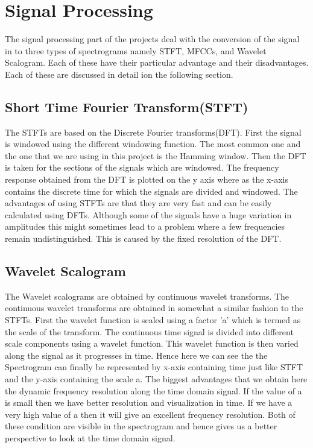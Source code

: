 \documentclass[conference]{IEEEtran}
\begin{document}
\section{Signal Processing}
The signal processing part of the projects deal with the conversion of the signal in to three types of spectrograms namely STFT, MFCCs, and Wavelet Scalogram. Each of these have their particular advantage and their disadvantages. Each of these are discussed in detail ion the following section.

\subsection{Short Time Fourier Transform(STFT)}

The STFTs are based on the Discrete Fourier transforms(DFT). First the signal is windowed using the different windowing function. The most common one and the one that we are using in this project is the Hamming window. Then the DFT is taken for the sections of the signals which are windowed. The frequency response obtained from the DFT is plotted on the y axis where as the x-axis contains the discrete time for which the signals are divided and windowed. The advantages of using STFTs are that they are very fast and can be easily calculated using DFTs. Although some of the signals have a huge variation in amplitudes this might sometimes lead to a problem where a few frequencies remain undistinguished. This is caused by the fixed resolution of the DFT.

\subsection{Wavelet Scalogram}

The Wavelet scalograms are obtained by continuous wavelet transforms. The continuous wavelet transforms are obtained in somewhat a similar fashion to the STFTs. First the wavelet function is scaled using a factor 'a' which is termed as the scale of the transform. The continuous time signal is divided into different scale components using a wavelet function. This wavelet function is then varied along the signal as it progresses in time. Hence here we can see the the Spectrogram can finally be represented by x-axis containing time just like STFT and the y-axis containing the scale a. The biggest advantages that we obtain here the dynamic frequency resolution along the time domain signal. If the value of a is small then we have better resolution and visualization in time. If we have a very high value of a then it will give an excellent frequency resolution. Both of these condition are visible in the spectrogram and hence gives us a better perspective to look at the time domain signal.
\end{document}
